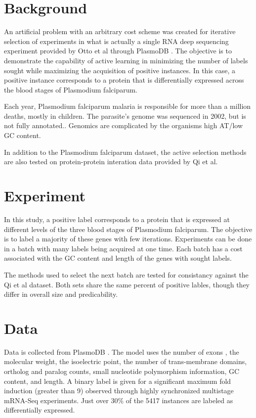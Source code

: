 \documentclass[10pt,a4pape r]{article}
\begin{document}
\begin{center}\Large \bfseries \PSName \end{center}


\section{Background}
An artificial problem with an arbitrary cost scheme was created for iterative selection of experiments in what is actually a single RNA deep sequencing experiment provided by Otto et al \cite{llinas} through PlasmoDB \cite{plasmodb}.  The objective is to demonstrate the capability of active learning in minimizing the number of labels sought while maximizing the acquisition of positive instances. In this case, a positive instance corresponds to a protein that is differentially expressed across the blood stages of Plasmodium falciparum.

Each year, Plasmodium falciparum malaria is responsible for more than a million deaths, mostly in children. The parasite's genome was sequenced in 2002, but is not fully annotated.\cite{llinas}. Genomics are complicated by the organisms high AT/low GC content. 

In addition to the Plasmodium falciparum dataset, the active selection methods are also tested on protein-protein interation data provided by Qi et al\cite{qi}.

\section{Experiment}
In this study, a positive label corresponds to a protein that is expressed at different levels of the three blood stages of Plasmodium falciparum. The objective is to label a majority of these genes with few iterations. Experiments can be done in a batch with many labels being acquired at one time.  Each batch has a cost associated with the GC content and length of the genes with sought labels. 

The methods used to select the next batch are tested for consistancy against the Qi et al dataset. Both sets share the same percent of positive lables, though they differ in overall size and predicability.

\section{Data}
Data is collected from PlasmoDB \cite{plasmodb}. The model uses the number of exons , the molecular weight, the isoelectric point, the number of trans-membrane domains, ortholog and paralog counts, small nucleotide polymorphism information, GC content, and length. A binary label is given for a significant maximum fold induction (greater than 9) observed through highly synchronized multistage  mRNA-Seq experiments\cite{llinas}. Just over 30\% of the 5417 instances are labeled as differentially expressed.
\end{document}
